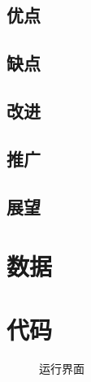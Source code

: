 \documentclass{ctexart}
\newcounter{sub}
\begin{document}
\subsection{优点}%
\label{sub:优点}

\subsection{缺点}%
\label{sub:缺点}

\subsection{改进}%
\label{sub:改进}

\subsection{推广}%
\label{sub:推广}

\subsection{展望}%
\label{sub:展望}

\newpage






\renewcommand{\thesection}{\Alph{section}~}

\appendix

\section{数据}%
\label{sec:数据}

\section{代码}%
\label{sec:代码}


\begin{figure}[htpb]
	\centering
	\caption{运行界面}
	\label{fig:运行界面}
\end{figure}


\printindex
\end{document}
